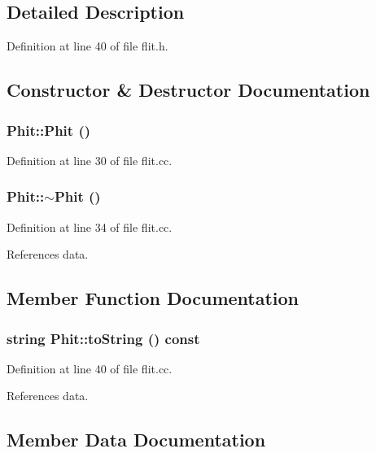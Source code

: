 \subsection{Detailed Description}


Definition at line 40 of file flit.h.

\subsection{Constructor \& Destructor Documentation}
\subsubsection[{Phit}]{\setlength{\rightskip}{0pt plus 5cm}Phit::Phit ()}\label{classPhit_ffcfc94e38419efe2318add1830fa3cc}




Definition at line 30 of file flit.cc.
\subsubsection[{$\sim$Phit}]{\setlength{\rightskip}{0pt plus 5cm}Phit::$\sim$Phit ()}\label{classPhit_6901e28fe471c2db1597bb2ce8ac25ba}




Definition at line 34 of file flit.cc.

References data.

\subsection{Member Function Documentation}
\subsubsection[{toString}]{\setlength{\rightskip}{0pt plus 5cm}string Phit::toString () const}\label{classPhit_71d43cdc2c23a7788b8724a4b12b261b}




Definition at line 40 of file flit.cc.

References data.

\subsection{Member Data Documentation}
